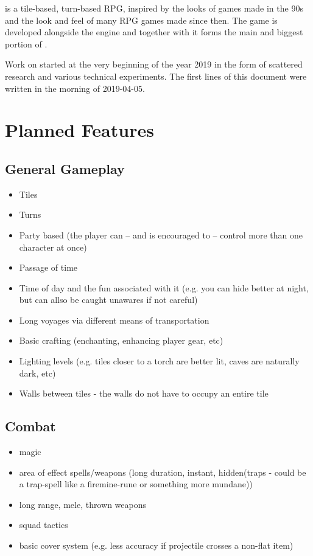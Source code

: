 \documentclass[a4paper,10pt]{book}
\begin{document}
\Gamename{} is a tile-based, turn-based RPG, inspired by the looks of games made in the 90s and the look and feel of many RPG games made since then. The game is developed alongside the engine \Enginename{} and together with it forms the main and biggest portion of \Projectname{}.

Work on \Projectname{} started at the very beginning of the year 2019 in the
form of scattered research and various technical experiments. The first lines of
this document were written in the morning of 2019-04-05.

\section{Planned Features}
\subsection{General Gameplay}
\begin{itemize}
  \item Tiles
  \item Turns
  \item Party based (the player can -- and is encouraged to -- control more than one character at once)
  \item Passage of time
  \item Time of day and the fun associated with it (e.g. you can hide better at night, but can allso be caught
    unawares if not careful)
  \item Long voyages via different means of transportation
  \item Basic crafting (enchanting, enhancing player gear, etc)
  \item Lighting levels (e.g. tiles closer to a torch are better lit, caves
    are naturally dark, etc)
  \item Walls between tiles - the walls do not have to occupy an entire tile
\end{itemize}

\subsection{Combat}
\begin{itemize}
  \item magic
  \item area of effect spells/weapons (long duration, instant, hidden(traps -
    could be a trap-spell like a firemine-rune or something more mundane))
  \item long range, mele, thrown weapons
  \item squad tactics
  \item basic cover system (e.g. less accuracy if projectile crosses a non-flat item)
\end{itemize}
\end{document}
